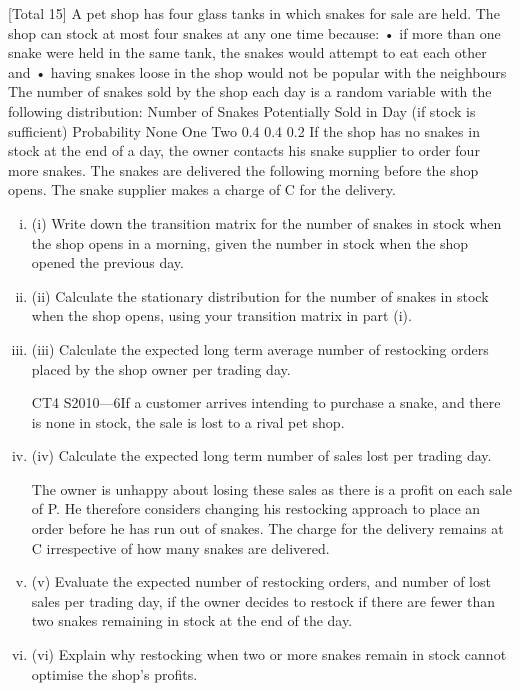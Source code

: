 \documentclass[a4paper,12pt]{article}
\begin{document}
\begin{enumerate}

[Total 15]
A pet shop has four glass tanks in which snakes for sale are held. The shop can stock
at most four snakes at any one time because:
• if more than one snake were held in the same tank, the snakes would attempt to
eat each other and
• having snakes loose in the shop would not be popular with the neighbours
The number of snakes sold by the shop each day is a random variable with the
following distribution:
Number of Snakes Potentially Sold
in Day (if stock is sufficient) Probability
None
One
Two 0.4
0.4
0.2
If the shop has no snakes in stock at the end of a day, the owner contacts his snake
supplier to order four more snakes. The snakes are delivered the following morning
before the shop opens. The snake supplier makes a charge of C for the delivery.
\begin{enumerate}[(i)]
\item (i) Write down the transition matrix for the number of snakes in stock when the
shop opens in a morning, given the number in stock when the shop opened the
previous day.

\item (ii) Calculate the stationary distribution for the number of snakes in stock when
the shop opens, using your transition matrix in part (i).
\item (iii) Calculate the expected long term average number of restocking orders placed
by the shop owner per trading day.

CT4 S2010—6If a customer arrives intending to purchase a snake, and there is none in stock, the sale
is lost to a rival pet shop.
\item (iv)
Calculate the expected long term number of sales lost per trading day.

The owner is unhappy about losing these sales as there is a profit on each sale of P.
He therefore considers changing his restocking approach to place an order before he
has run out of snakes. The charge for the delivery remains at C irrespective of how
many snakes are delivered.
\item (v) Evaluate the expected number of restocking orders, and number of lost sales
per trading day, if the owner decides to restock if there are fewer than two
snakes remaining in stock at the end of the day.
\item 
(vi) Explain why restocking when two or more snakes remain in stock cannot
optimise the shop’s profits.


\end{enumerate}
\end{enumerate}
\end{document}
